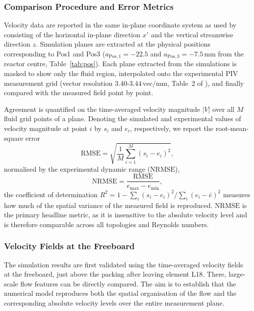 \subsubsection{Comparison Procedure and Error Metrics}
\label{sec:validation:procedure}

Velocity data are reported in the same in-plane coordinate system as used by~\cite{velten2026} consisting of the horizontal in-plane direction $x'$ and the vertical streamwise direction $z$. Simulation planes are extracted at the physical positions corresponding to Pos1 and Pos3 ($a_{\mathrm{Pos},1} = -22.5$ and $a_{\mathrm{Pos},3} = -7.5\,\mathrm{mm}$ from the reactor centre, Table~\ref{tab:pos}). Each plane extracted from the simulations is masked to show only the fluid region, interpolated onto the experimental PIV measurement grid (vector resolution $3.40$-$3.44\,\mathrm{vec/mm}$, Table~2 of \cite{velten2026}), and finally compared with the measured field point by point.

Agreement is quantified on the time-averaged velocity magnitude $|V|$ over all $M$ fluid grid points of a plane. Denoting the simulated and experimental values of velocity magnitude at point $i$ by $s_i$ and $e_i$, respectively, we report the root-mean-square error
\begin{equation}
    \mathrm{RMSE} = \sqrt{\frac{1}{M}\sum_{i=1}^{M}\left(s_i-e_i\right)^2},
\end{equation}
normalised by the experimental dynamic range ($\mathrm{NRMSE}$),
\begin{equation}
\mathrm{NRMSE} = \frac{\mathrm{RMSE}}{e_\mathrm{max}-e_\mathrm{min}},
    \label{eq:rmse}
\end{equation}
the coefficient of determination $R^2 = 1-\sum_i(s_i-e_i)^2/\sum_i(e_i-\bar{e})^2$ measures how much of the spatial variance of the measured field is reproduced. $\mathrm{NRMSE}$ is the primary headline metric, as it is insensitive to the absolute velocity level and is therefore comparable across all topologies and Reynolds numbers.

\subsubsection{Velocity Fields at the Freeboard}
\label{sec:validation:surface}

The simulation results are first validated using the time-averaged velocity fields at the freeboard, just above the packing after leaving element L18. There, large-scale flow features can be directly compared. The aim is to establish that the numerical model reproduces both the spatial organisation of the flow and the corresponding absolute velocity levels over the entire measurement plane.

